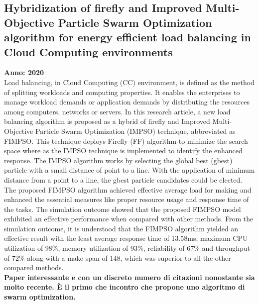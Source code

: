 \subsection{Hybridization of firefly and Improved Multi-Objective Particle Swarm Optimization algorithm for energy efficient load balancing in Cloud Computing environments}
\textbf{Anno: 2020}~\cite{DEVARAJ202036}\\
Load balancing, in Cloud Computing (CC) environment, is defined as the method of splitting workloads and computing properties. 
It enables the enterprises to manage workload demands or application demands by distributing the resources among computers, networks or servers. 
In this research article, a new load balancing algorithm is proposed as a hybrid of firefly and 
Improved Multi-Objective Particle Swarm Optimization (IMPSO) technique, abbreviated as FIMPSO. 
This technique deploys Firefly (FF) algorithm to minimize the search space where as the IMPSO technique is implemented to identify the enhanced response. 
The IMPSO algorithm works by selecting the global best (gbest) particle with a small distance of point to a line. 
With the application of minimum distance from a point to a line, the gbest particle candidates could be elected. 
The proposed FIMPSO algorithm achieved effective average load for making and enhanced the essential measures like proper resource usage and response time of the tasks. 
The simulation outcome showed that the proposed FIMPSO model exhibited an effective performance when compared with other methods. 
From the simulation outcome, it is understood that the FIMPSO algorithm yielded an effective result with the least average response time of 13.58ms, 
maximum CPU utilization of 98\%, memory utilization of 93\%, reliability of 67\% and throughput of 72\% along with a make span of 148, 
which was superior to all the other compared methods.\\

\textbf{Paper interessante e con un discreto numero di citazioni nonostante sia molto recente. È il primo che incontro che propone uno algoritmo di swarm optimization.}


